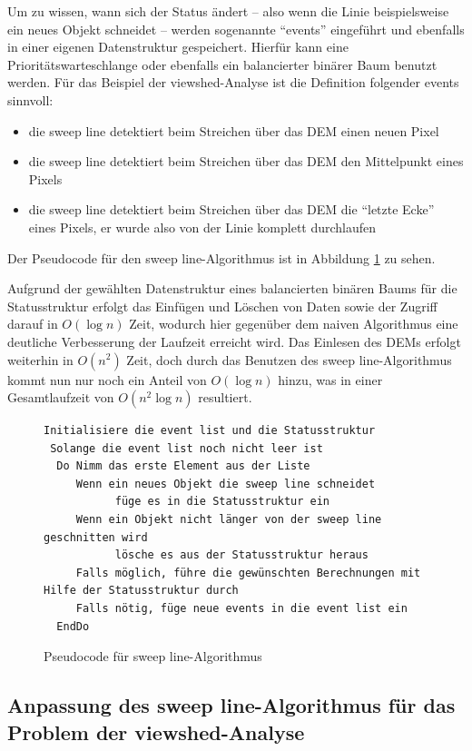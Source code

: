 Um zu wissen, wann sich der Status ändert -- also wenn die Linie beispielsweise ein neues Objekt schneidet -- werden sogenannte ``events'' eingeführt
und ebenfalls in einer eigenen Datenstruktur gespeichert. Hierfür kann eine Prioritätswarteschlange oder ebenfalls ein balancierter binärer Baum 
benutzt werden. Für das Beispiel der viewshed-Analyse ist die Definition folgender events sinnvoll: 
\begin{itemize}
 \item die sweep line detektiert beim Streichen über das DEM einen neuen Pixel
 \item die sweep line detektiert beim Streichen über das DEM den Mittelpunkt eines Pixels
 \item die sweep line detektiert beim Streichen über das DEM die ``letzte Ecke'' eines Pixels, er wurde also von der Linie komplett durchlaufen
\end{itemize}

Der Pseudocode für den sweep line-Algorithmus ist in Abbildung \ref{pseudo} zu sehen.
\vspace{5pt}

Aufgrund der gewählten Datenstruktur eines balancierten binären Baums für die Statusstruktur erfolgt das Einfügen und Löschen von Daten sowie der 
Zugriff darauf in $O(\log n)$ Zeit, wodurch hier gegenüber dem naiven Algorithmus eine deutliche Verbesserung der Laufzeit erreicht wird. Das 
Einlesen des DEMs erfolgt weiterhin in $O(n^2)$ Zeit, doch durch das Benutzen des sweep line-Algorithmus kommt nun nur noch ein Anteil von 
$O(\log n)$ hinzu, was in einer Gesamtlaufzeit von $O(n^2\log n)$ resultiert.

\begin{figure}[!ht]
 \centering
 \begin{BVerbatim}
Initialisiere die event list und die Statusstruktur
 Solange die event list noch nicht leer ist 
  Do Nimm das erste Element aus der Liste 
     Wenn ein neues Objekt die sweep line schneidet
	       füge es in die Statusstruktur ein
     Wenn ein Objekt nicht länger von der sweep line geschnitten wird
	       lösche es aus der Statusstruktur heraus
     Falls möglich, führe die gewünschten Berechnungen mit Hilfe der Statusstruktur durch      
     Falls nötig, füge neue events in die event list ein
  EndDo
\end{BVerbatim}
\caption{Pseudocode für sweep line-Algorithmus}
\label{pseudo}
\end{figure}

\subsection{Anpassung des sweep line-Algorithmus für das Problem der viewshed-Analyse}

